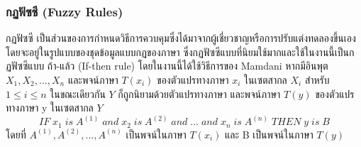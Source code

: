 \subsubsection{กฏฟัซซี (Fuzzy Rules)}
กฏฟัซซี \cite{Sansanee} เป็นส่วนของการกำหนดวิธีการควบคุมซึ่งได้มาจากผู้เชี่ยวชาญหรือการปรับแต่งทดลองขึ้นเองโดยจะอยู่ในรูปแบบของชุดข้อมูลแบบกฏของภาษา ซึ่งกฏฟัซซีแบบที่นิยมใช้มากและใช้ในงานนี้เป็นกฏฟัซซีแบบ ถ้า-แล้ว (If-then rule)
โดยในงานนี้ได้ใช้วิธีการของ Mamdani หากมีอินพุต \(X_{1},X_{2},...,X_{n}\) และพจน์ภาษา \(T(x_{i})\) ของตัวแปรทางภาษา \(x_{i}\) ในเซตสากล \(X_{i}\) สำหรับ \(1 \le i \le n\) ในขณะเดียวกัน \(Y\) ก็ถูกนิยามด้วยตัวแปรทางภาษา และพจน์ภาษา \(T(y)\) ของตัวแปรทางภาษา y ในเซตสากล \(Y\)
\[ IF\; x_{1}\; is\; A^{(1)}\; and\; x_{2}\; is\; A^{(2)}\; and\; ... \; and\; x_{n}\; is\; A^{(n)}\; THEN\; y\; is\; B \]
โดยที่ \(A^{(1)},A^{(2)},...,A^{(n)}\) เป็นพจน์ในภาษา \(T(x_{i})\) และ B เป็นพจน์ในภาษา \(T(y)\)

